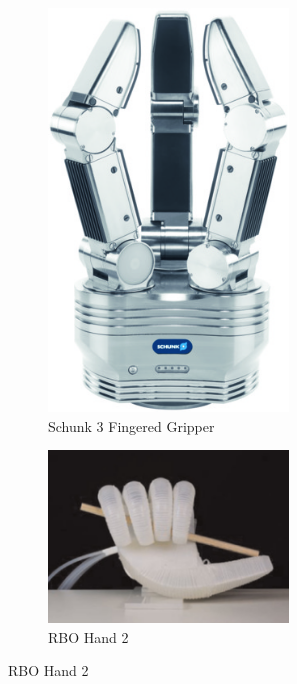\begin{figure}
\begin{subfigure}{.3\linewidth}
    \includegraphics[width=0.7\textwidth]{Images/Schunk3FingeredGripper.jpg}
        \caption[Schunk 3 Fingered Gripper]{Schunk 3 Fingered Gripper \cite{Schunk3FingerGripper}}
        \label{fig:Schunk3FingeredGripper}
    \end{subfigure}
    \begin{subfigure}{.3\linewidth}
        \centering
        \includegraphics[width=0.7\textwidth]{Images/SoftRoboticGripper.png}
        \caption[RBO Hand 2]{RBO Hand 2 \cite{RBOHand2}}
        \label{fig:RBOHand2}
    \end{subfigure}
\end{figure}


